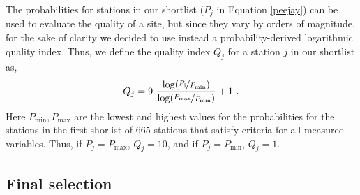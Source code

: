 \documentclass[a4paper,fleqn,usenatbib]{mnras}
\begin{document}
The probabilities for stations in our shortlist ($P_j$ in Equation \ref{peejay}) can be used to evaluate the quality of a site, but since they vary by orders of magnitude, for the sake of clarity we decided to use instead a probability-derived logarithmic quality index. Thus, we define the quality index $Q_j$ for a station $j$ in our shortlist as,
\begin{equation}
Q_j=9\ \frac{\log (\nicefrac{P_\mathrm{j}}{P_\mathrm{min}})}{\log (\nicefrac{P_\mathrm{max}}{P_\mathrm{min}})}+1\ .
\end{equation}
Here $P_\mathrm{min},P_\mathrm{max}$ are the lowest and highest values for the probabilities for the stations in the first shorlist of 665 stations that satisfy criteria for all measured variables. Thus, if $P_j=P_\mathrm{max}$, $Q_j=10$, and if $P_j=P_\mathrm{min}$, $Q_j=1$.

\subsection{Final selection}
\end{document}
